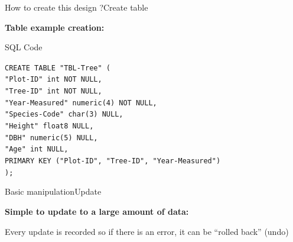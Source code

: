 \documentclass[table]{eecslides}
\begin{document}
\begin{frame}{How to create this design ?}{Create table}

\textbf{Table example creation:}
\begin{block}{SQL Code}
\begin{tabbing}
\texttt{CREATE TABLE "TBL-Tree" (\\
		\hspace{1cm} "Plot-ID" int NOT NULL,\\
		\hspace{1cm} "Tree-ID" int NOT NULL,\\
		\hspace{1cm} "Year-Measured" numeric(4) NOT NULL,\\
		\hspace{1cm} "Species-Code" char(3) NULL,\\
		\hspace{1cm} "Height" float8 NULL,\\
		\hspace{1cm} "DBH" numeric(5) NULL,\\
		\hspace{1cm} "Age" int NULL,\\
PRIMARY KEY ("Plot-ID", "Tree-ID", "Year-Measured") \\
);
}
\end{tabbing}
\end{block}

\end{frame}


\begin{frame}{Basic manipulation}{Update}

\textbf{Simple to update to a large amount of data:}

Every update is recorded so if there is an error, it can be “rolled back” (undo)
\end{frame}

\end{document}
